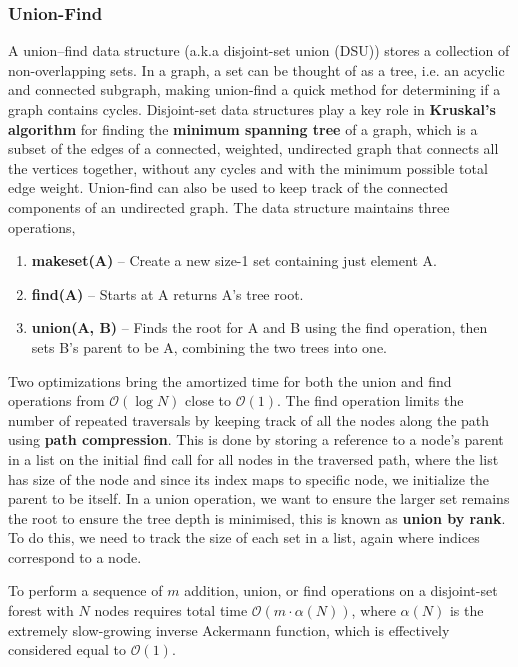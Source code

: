 \documentclass{article}
\newcommand{\bigO}{\mathcal{O}}
\begin{document}
\subsubsection{Union-Find}
A union–find data structure (a.k.a disjoint-set union (DSU)) stores a collection of non-overlapping sets. In a graph, a set can be thought of as a tree, i.e. an acyclic and connected subgraph, making union-find a quick method for determining if a graph contains cycles. Disjoint-set data structures play a key role in \textbf{Kruskal's algorithm} for finding the \textbf{minimum spanning tree} of a graph, which is a subset of the edges of a connected, weighted, undirected graph that connects all the vertices together, without any cycles and with the minimum possible total edge weight. Union-find can also be used to keep track of the connected components of an undirected graph. The data structure maintains three operations,
\begin{enumerate}
    \item \textbf{makeset(A)} -- Create a new size-1 set containing just element A.
    \item \textbf{find(A)} -- Starts at A returns A's tree root.
    \item \textbf{union(A, B) } --  Finds the root for A and B using the find operation, then sets B's parent to be A, combining the two trees into one.
\end{enumerate}

Two optimizations bring the amortized time for both the union and find operations from $\bigO(\log N)$ close to $\bigO(1)$. The find operation limits the number of repeated traversals by keeping track of all the nodes along the path using \textbf{path compression}. This is done by storing a reference to a node's parent in a list on the initial find call for all nodes in the traversed path, where the list has size of the node and since its index maps to specific node, we initialize the parent to be itself. In a union operation, we want to ensure the larger set  remains the root to ensure the tree depth is minimised, this is known as \textbf{union by rank}. To do this, we need to track the size of each set in a list, again where indices correspond to a node. 

To perform a sequence of $m$ addition, union, or find operations on a disjoint-set forest with $N$ nodes requires total time $\bigO(m \cdot \alpha(N))$, where $\alpha(N)$ is the extremely slow-growing inverse Ackermann function, which is effectively considered equal to $\bigO(1)$.
\end{document}
